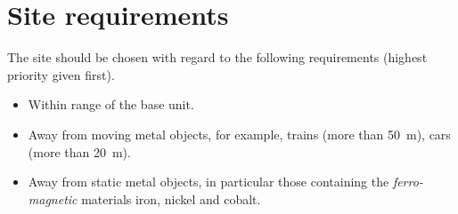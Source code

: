 \chapter{Site requirements}

The site should be chosen with regard to the following requirements
(highest priority given first).

\begin{itemize}
\item Within range of the base unit.
\item Away from moving metal objects, for example, trains (more than
  \SI{50}{\metre}), cars (more than \SI{20}{\metre}).
\item Away from static metal objects, in particular those containing
  the \emph{ferro-magnetic} materials iron, nickel and cobalt.
\end{itemize}

